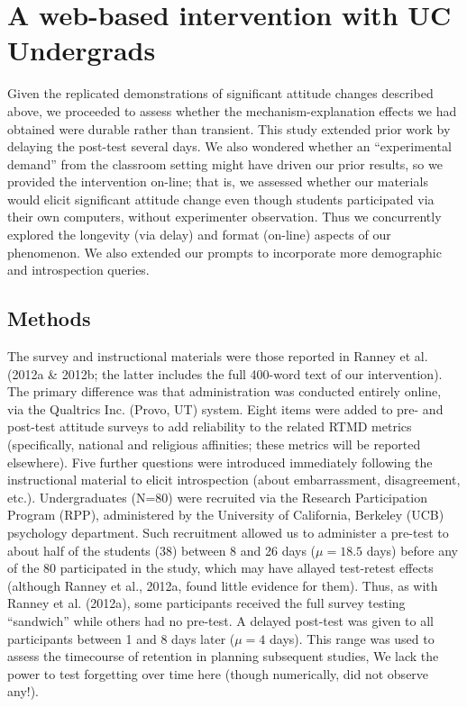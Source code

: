 \section{A web-based intervention with UC Undergrads}

Given the replicated demonstrations of significant attitude changes described
above, we proceeded to assess whether the mechanism-explanation effects we had
obtained were durable rather than transient. This study extended prior work by
delaying the post-test several days. We also wondered whether an ``experimental
demand'' from the classroom setting might have driven our prior results, so we
provided the intervention on-line; that is, we assessed whether our materials
would elicit significant attitude change even though students participated via
their own computers, without experimenter observation. Thus we concurrently
explored the longevity (via delay) and format (on-line) aspects of our
phenomenon. We also extended our prompts to incorporate more demographic and
introspection queries.

\subsection{Methods}

The survey and instructional materials were those reported in Ranney et
al. (2012a \& 2012b; the latter includes the full 400-word text of our
intervention). The primary difference was that administration was conducted
entirely online, via the Qualtrics Inc. (Provo, UT) system. Eight items were
added to pre- and post-test attitude surveys to add reliability to the related
RTMD metrics (specifically, national and religious affinities; these metrics
will be reported elsewhere). Five further questions were introduced immediately
following the instructional material to elicit introspection (about
embarrassment, disagreement, etc.).  Undergraduates (N=80) were recruited via
the Research Participation Program (RPP), administered by the University of
California, Berkeley (UCB) psychology department. Such recruitment allowed us to
administer a pre-test to about half of the students (38) between 8 and 26 days
($\mu=18.5$ days) before any of the 80 participated in the study, which may have
allayed test-retest effects (although Ranney et al., 2012a, found little
evidence for them). Thus, as with Ranney et al. (2012a), some participants
received the full survey testing ``sandwich'' while others had no pre-test. A
delayed post-test was given to all participants between 1 and 8 days later
($\mu=4$ days). This range was used to assess the timecourse of retention in
planning subsequent studies, We lack the power to test forgetting over time here
(though numerically, did not observe any!).

